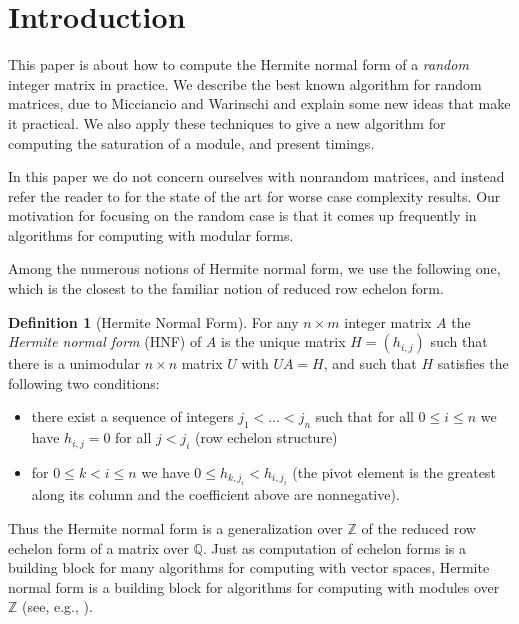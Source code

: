 \documentclass[preprint,12pt]{elsarticle}
\newcommand{\Z}{\mathbb{Z}}
\newcommand{\Q}{\mathbb{Q}}
\theoremstyle{plain}
\theoremstyle{definition}
\newtheorem{definition}[theorem]{Definition}
\numberwithin{equation}{section}
\numberwithin{figure}{section}
\numberwithin{table}{section}
\begin{document}
\section{Introduction}

This paper is about how to compute the Hermite normal form of a {\em
  random} integer matrix in practice.  We describe the best known
algorithm for random matrices, due to Micciancio and Warinschi \cite{MicWar01}
and explain some new ideas that make it practical.  We also
apply these techniques to give a new algorithm for computing the
saturation of a module, and present timings.

In this paper we do not concern ourselves with nonrandom matrices, and
instead refer the reader to
\cite{Storjohann96asymptoticallyfast,Storjohann98computinghermite} for
the state of the art for worse case complexity results.  Our
motivation for focusing on the random case is that it comes up
frequently in algorithms for computing with modular forms.

Among the numerous notions of Hermite normal form, we use the
following one, which is the closest to the familiar notion of reduced
row echelon form.

\begin{definition}[Hermite Normal Form]
  For any $n\times m$ integer matrix $A$ the {\em Hermite
    normal form} (HNF) of $A$ is the unique matrix  $H=(h_{i,j})$ such that there is a
  unimodular $n\times n$ matrix $U$ with $UA=H$, and such that $H$ 
satisfies the following two conditions:
  \begin{itemize}
  \item there exist a sequence of integers $j_1< \dots < j_n$ such that for all
    $0\leq i \leq n$ we have $h_{i,j}=0$ for all $j<j_i$ (row echelon structure)
  \item for $0\leq k< i \leq n$ we have $0\leq h_{k,j_i}< h_{i,j_i}$
    (the pivot element is the greatest along its column and the
    coefficient above are nonnegative).
  \end{itemize}
\end{definition}

Thus the Hermite normal form  is a generalization over $\Z$ of
the reduced row echelon form of a matrix over $\Q$.  Just as
computation of echelon forms is a building block for many algorithms
for computing with vector spaces, Hermite normal form is a building
block for algorithms for computing with modules over $\Z$ (see, e.g.,
\cite[Ch.~2]{cohen:course}).
\end{document}
